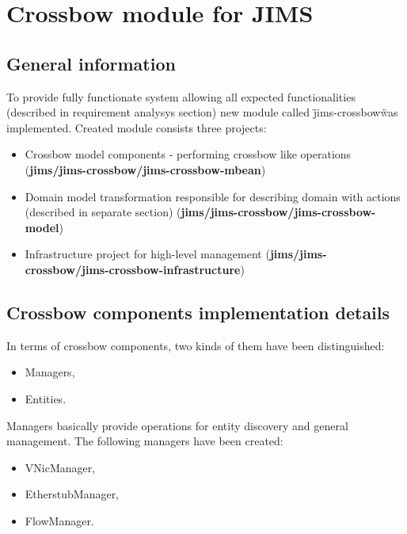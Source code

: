 \documentclass[11pt]{book}
\begin{document}
	  \section{Crossbow module for JIMS}
		\label{sec:impl:module}
	
		\subsection{General information}
			\label{sec:impl:general}
		
			To provide fully functionate system allowing all expected functionalities (described in requirement analysys section)
			new module called \"jims-crossbow\" was implemented. Created module consists three projects:
			\begin{itemize}
				\item{Crossbow model components - performing crossbow like operations (\textbf{jims/jims-crossbow/jims-crossbow-mbean})}
				\item{Domain model transformation responsible for describing domain with actions 
					(described in separate section) (\textbf{jims/jims-crossbow/jims-crossbow-model})}
				\item{Infrastructure project for high-level management (\textbf{jims/jims-crossbow/jims-crossbow-infrastructure})}
			\end{itemize}
		
		\subsection{Crossbow components implementation details}
			\label{sec:impl:comp}
	
		In terms of crossbow components, two kinds of them have been distinguished:

		\begin{itemize}
			\item Managers,
			\item Entities.
		\end{itemize}

		Managers basically provide operations for entity discovery and general management. The following managers have
		been created:

		\begin{itemize}
			\item VNicManager,
			\item EtherstubManager,
			\item FlowManager.
		\end{itemize}
\end{document}

